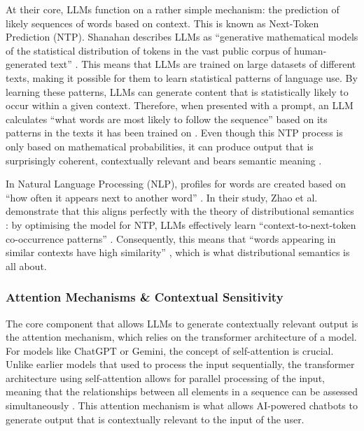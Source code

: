 \documentclass[11pt,a4paper]{article}
\begin{document}
At their core, LLMs function on a rather simple mechanism: the prediction of likely sequences of words based on context. This is known as Next-Token Prediction (NTP). Shanahan describes LLMs as ``generative mathematical models of the statistical distribution of tokens in the vast public corpus of human-generated text'' \parencite*[2]{shanahanTalkingLargeLanguage2022}. This means that LLMs are trained on large datasets of different texts, making it possible for them to learn statistical patterns of language use. By learning these patterns, LLMs can generate content that is statistically likely to occur within a given context. Therefore, when presented with a prompt, an LLM calculates ``what words are most likely to follow the sequence'' based on its patterns in the texts it has been trained on \parencite[2]{shanahanTalkingLargeLanguage2022}. Even though this NTP process is only based on mathematical probabilities, it can produce output that is surprisingly coherent, contextually relevant and bears semantic meaning \parencite{zhao2025geometry}. 

In Natural Language Processing (NLP), profiles for words are created based on ``how often it appears next to another word'' \parencite[214]{holmesArtificialIntelligenceEducation2019}. In their study, Zhao et al. \parencite{zhao2025geometry} demonstrate that this aligns perfectly with the theory of distributional semantics \parencite{harris1954distributional}: by optimising the model for NTP, LLMs effectively learn ``context-to-next-token co-occurrence patterns'' \parencite[1]{zhao2025geometry}. Consequently, this means that ``words appearing in similar contexts have high similarity'' \parencite[Section 3.1]{zhao2025geometry}, which is what distributional semantics is all about.


\subsubsection{Attention Mechanisms \& Contextual Sensitivity}\label{subsubsec:attention}

The core component that allows LLMs to generate contextually relevant output is the attention mechanism, which relies on the transformer architecture of a model. For models like ChatGPT or Gemini, the concept of self-attention is crucial. Unlike earlier models that used to process the input sequentially, the transformer architecture using self-attention allows for parallel processing of the input, meaning that the relationships between all elements in a sequence can be assessed simultaneously \parencite{vaswaniAttentionAllYou}. This attention mechanism is what allows AI-powered chatbots to generate output that is contextually relevant to the input of the user. 
\end{document}
